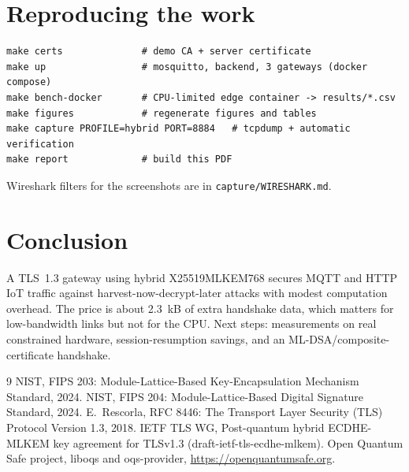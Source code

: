 \documentclass[11pt,a4paper]{article}
\begin{document}
\section{Reproducing the work}
\begin{lstlisting}
make certs              # demo CA + server certificate
make up                 # mosquitto, backend, 3 gateways (docker compose)
make bench-docker       # CPU-limited edge container -> results/*.csv
make figures            # regenerate figures and tables
make capture PROFILE=hybrid PORT=8884   # tcpdump + automatic verification
make report             # build this PDF
\end{lstlisting}
Wireshark filters for the screenshots are in \texttt{capture/WIRESHARK.md}.

\section{Conclusion}
A TLS~1.3 gateway using hybrid X25519MLKEM768 secures MQTT and HTTP IoT traffic against
harvest-now-decrypt-later attacks with modest computation overhead. The price is about
2.3~kB of extra handshake data, which matters for low-bandwidth links but not for the CPU.
Next steps: measurements on real constrained hardware, session-resumption savings, and an
ML-DSA/composite-certificate handshake.

\begin{thebibliography}{9}
 NIST, FIPS 203: Module-Lattice-Based Key-Encapsulation Mechanism Standard, 2024.
 NIST, FIPS 204: Module-Lattice-Based Digital Signature Standard, 2024.
 E.~Rescorla, RFC 8446: The Transport Layer Security (TLS) Protocol Version 1.3, 2018.
 IETF TLS WG, Post-quantum hybrid ECDHE-MLKEM key agreement for TLSv1.3 (draft-ietf-tls-ecdhe-mlkem).
 Open Quantum Safe project, liboqs and oqs-provider, \url{https://openquantumsafe.org}.
\end{thebibliography}
\end{document}
